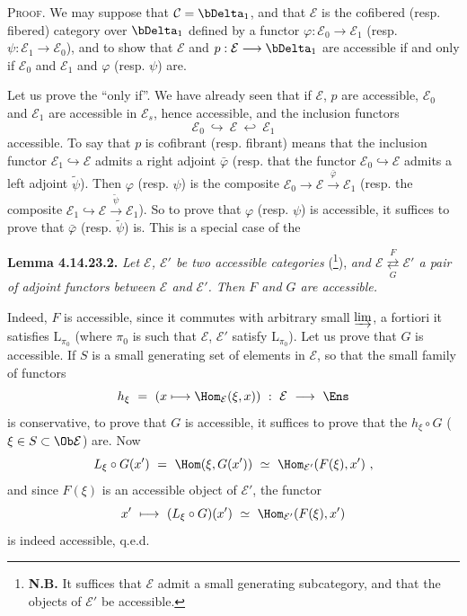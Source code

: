 \textsc{Proof.} We may suppose that $\mathcal{C}=\bDelta_1$, and that $\mathcal{E}$ is the cofibered (resp. fibered) category over $\bDelta_1$ defined by a functor $\varphi:\mathcal{E}_0\longrightarrow\mathcal{E}_1$ (resp. $\psi:\mathcal{E}_1\longrightarrow\mathcal{E}_0$), and to show that $\mathcal{E}$ and $p:\mathcal{E}\longrightarrow\bDelta_1$ are accessible if and only if $\mathcal{E}_0$ and $\mathcal{E}_1$ and $\varphi$ (resp. $\psi$) are.


Let us prove the ``only if''. We have already seen that if $\mathcal{E}$, $p$ are accessible, $\mathcal{E}_0$ and $\mathcal{E}_1$ are accessible in $\mathcal{E}_s$, hence accessible, and the inclusion functors %
\[
\mathcal{E}_0\ \hookrightarrow\ \mathcal{E}\ \hookleftarrow\ \mathcal{E}_1
\]
accessible. To say that $p$ is cofibrant (resp. fibrant) means that the inclusion functor $\mathcal{E}_1\hookrightarrow\mathcal{E}$ admits a right adjoint $\bar{\varphi}$ (resp. that the functor $\mathcal{E}_0\hookrightarrow\mathcal{E}$ admits a left adjoint $\tilde{\psi}$). Then $\varphi$ (resp. $\psi$) is the composite $\mathcal{E}_0\longrightarrow\mathcal{E}\xrightarrow{\;\bar{\varphi}\;}\mathcal{E}_1$ (resp. the composite $\mathcal{E}_1\hookrightarrow\mathcal{E}\xrightarrow{\;\tilde{\psi}\;}\mathcal{E}_1$). So to prove that $\varphi$ (resp. $\psi$) is accessible, it suffices to prove that $\bar{\varphi}$ (resp. $\tilde{\psi}$) is. This is a special case of the %

\textbf{Lemma 4.14.23.2.} \textit{Let $\mathcal{E}$, $\mathcal{E}'$ be two accessible categories} (\footnote[172]{\textbf{N.B.} It suffices that $\mathcal{E}$ admit a small generating subcategory, and that the objects of $\mathcal{E}'$ be accessible.}), \textit{and $\mathcal{E}\underset{G}{\overset{F}{\rightleftarrows}}\mathcal{E}'$ a pair of adjoint functors between $\mathcal{E}$ and $\mathcal{E}'$. Then $F$ and $G$ are accessible.}


Indeed, $F$ is accessible, since it commutes with arbitrary small $\varinjlim$, a fortiori it satisfies $\mathrm{L}_{\pi_0}$ (where $\pi_0$ is such that $\mathcal{E}$, $\mathcal{E}'$ satisfy $\mathrm{L}_{\pi_0}$). Let us prove that $G$ is accessible. If $S$ is a
small generating set of elements in $\mathcal{E}$, so that the small family of functors
\[
h_\xi\ =\ (x\longmapsto\Hom_{\mathcal{E}}(\xi,x))\ :\ \mathcal{E}\ \longrightarrow\ \Ens
\]
is conservative, to prove that $G$ is accessible, it suffices to prove that the $h_\xi\circ G$ ($\xi\in S\subset\Ob\mathcal{E}$) are. Now
\[
L_\xi\circ G(x')\ =\ \Hom(\xi,G(x'))\ \simeq\ \Hom_{\mathcal{E}'}(F(\xi),x')\ , %
\]
and since $F(\xi)$ is an accessible object of $\mathcal{E}'$, the functor
\[
x'\ \longmapsto\ (L_\xi\circ G)(x')\ \simeq\ \Hom_{\mathcal{E}'}(F(\xi),x') %
\]
is indeed accessible, q.e.d.

